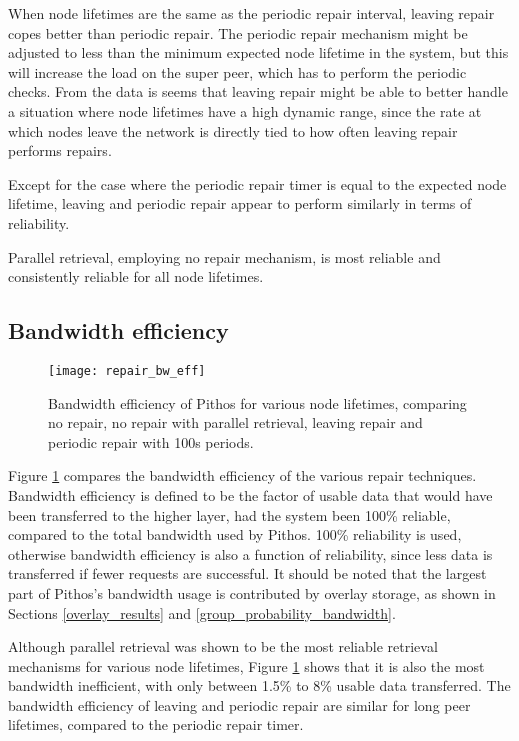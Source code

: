 When node lifetimes are the same as the periodic repair interval, leaving repair copes better than periodic repair. The periodic repair mechanism might be adjusted to less than the minimum expected node lifetime in the system, but this will increase the load on the super peer, which has to perform the periodic checks. From the data is seems that leaving repair might be able to better handle a situation where node lifetimes have a high dynamic range, since the rate at which nodes leave the network is directly tied to how often leaving repair performs repairs.

Except for the case where the periodic repair timer is equal to the expected node lifetime, leaving and periodic repair appear to perform similarly in terms of reliability.

Parallel retrieval, employing no repair mechanism, is most reliable and consistently reliable for all node lifetimes.

\subsection{Bandwidth efficiency}

\begin{figure}[htbp]
 \centering
 \texttt{[image: repair\_bw\_eff]}
 \caption{Bandwidth efficiency of Pithos for various node lifetimes, comparing no repair, no repair with parallel retrieval, leaving repair and periodic repair with 100s periods.}
 \label{fig_repair_bw_eff}
\end{figure}
%
Figure \ref{fig_repair_bw_eff} compares the bandwidth efficiency of the various repair techniques. Bandwidth efficiency is defined to be the factor of usable data that would have been transferred to the higher layer, had the system been 100\% reliable, compared to the total bandwidth used by Pithos. 100\% reliability is used, otherwise bandwidth efficiency is also a function of reliability, since less data is transferred if fewer requests are successful. It should be noted that the largest part of Pithos's bandwidth usage is contributed by overlay storage, as shown in Sections \ref{overlay_results} and \ref{group_probability_bandwidth}.

Although parallel retrieval was shown to be the most reliable retrieval mechanisms for various node lifetimes, Figure \ref{fig_repair_bw_eff} shows that it is also the most bandwidth inefficient, with only between 1.5\% to 8\% usable data transferred. The bandwidth efficiency of leaving and periodic repair are similar for long peer lifetimes, compared to the periodic repair timer.


